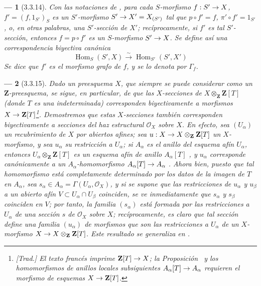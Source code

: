 \documentclass[oneside]{amsart}
\theoremstyle{ega-env-style}
\newtheorem*{env}{---}
\theoremstyle{ega-thm-env-style}
\theoremstyle{ega-defn-env-style}
\def\mathcal{\mathscr}
\def\bb{\mathbf}                    %
\renewcommand{\to}{\mathchoice{\longrightarrow}{\rightarrow}{\rightarrow}{\rightarrow}}
\let\EGAOriginalLabel\label
\renewcommand{\label}[1]{\phantomsection\EGAOriginalLabel{#1}}
\begin{document}
\begin{env}[3.3.14]
\label{I.3.3.14}
Con las notaciones de , para cada \emph{$S$-morfismo}
$f:S'\to X$, $f'=(f,1_{S'})_S$ es un $S'$-morfismo $S'\to X'=X_{(S')}$ tal que
$p\circ f'=f$, $\pi'\circ f'=1_{S'}$, o, en otras palabras, una
\emph{$S'$-sección de $X'$}; recíprocamente, si $f'$ es tal $S'$-sección, entonces
$f=p\circ f'$ es un
$S$-morfismo $S'\to X$. Se define así una \emph{correspondencia biyectiva}
canónica
\label{I.3.3.14.correspondence-fr}
\[
  \operatorname{Hom}_S(S',X)\overset{\sim}{\longrightarrow}
  \operatorname{Hom}_{S'}(S',X')
\]
Se dice que $f'$ es el \emph{morfismo grafo} de $f$, y se lo denota por
$\Gamma_f$.
\end{env}

\begin{env}[3.3.15]
\label{I.3.3.15}
Dado un preesquema $X$, que siempre se puede considerar como un $\mathbf{Z}$-preesquema,
se sigue, en particular, de  que las $X$-\emph{secciones} de
$X\otimes_{\mathbf{Z}}\mathbf{Z}[T]$ (donde $T$ es una indeterminada)
corresponden biyectivamente a \emph{morfismos} $X\to\mathbf{Z}[T]$\footnote{\emph{[Trad.]
El texto francés imprime $\bb{Z}[T]\to X$; la Proposición~ y los
homomorfismos de anillos locales subsiguientes $A_\alpha[T]\to A_\alpha$ requieren el morfismo de
esquemas $X\to\bb{Z}[T]$.}}. Demostremos que estas
$X$-secciones también corresponden biyectivamente a \emph{secciones del haz estructural
$\mathcal{O}_X$ sobre $X$}. En efecto, sea $(U_\alpha)$ un recubrimiento de $X$ por abiertos
afines; sea $u:X\to X\otimes_{\mathbf{Z}}\mathbf{Z}[T]$ un $X$-morfismo, y sea
$u_\alpha$ su restricción a $U_\alpha$; si $A_\alpha$ es el anillo del esquema
afín $U_\alpha$, entonces $U_\alpha\otimes_{\mathbf{Z}}\mathbf{Z}[T]$ es un esquema afín
de anillo $A_\alpha[T]$ , y $u_\alpha$ corresponde canónicamente a un
$A_\alpha$-homomorfismo $A_\alpha[T]\to A_\alpha$
. Ahora bien, puesto que tal homomorfismo está completamente determinado por
los datos de la imagen de $T$ en $A_\alpha$, sea
$s_\alpha\in A_\alpha=\Gamma(U_\alpha,\mathcal{O}_X)$, y si se supone que las
restricciones de $u_\alpha$ y $u_\beta$ a un abierto afín
$V\subset U_\alpha\cap U_\beta$ coinciden, se ve inmediatamente que
$s_\alpha$ y $s_\beta$ coinciden en $V$; por tanto, la familia $(s_\alpha)$ está formada
por las restricciones a $U_\alpha$ de una sección $s$ de $\mathcal{O}_X$ sobre $X$;
recíprocamente, es claro que tal sección define una familia $(u_\alpha)$ de
morfismos que son las restricciones a $U_\alpha$ de un $X$-morfismo
$X\to X\otimes_{\mathbf{Z}}\mathbf{Z}[T]$. Este resultado se generaliza en
.
\end{env}
\end{document}
